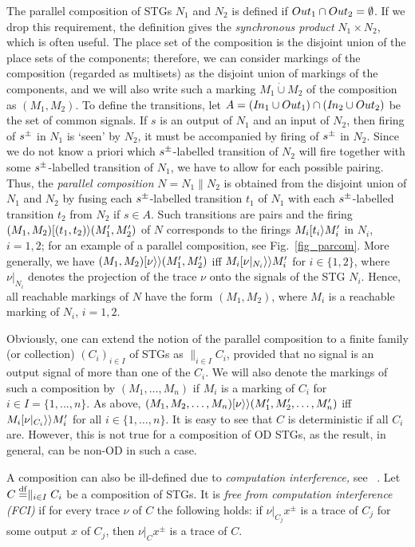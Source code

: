 The parallel composition of STGs $N_1$ and $N_2$ is defined if
$\Ot_1 \cap \Ot_2 = \emptyset$. If we drop this requirement, the
definition gives the {\em synchronous product} $N_1\times N_2$,
which is often useful. The place set of the composition is
the disjoint union of the place sets of the components; therefore,
we can consider markings of the composition (regarded as multisets)
as the disjoint union of markings of the components,
and we will also write such a marking $M_1 \dot{\cup} M_2$
of the composition as $(M_1, M_2)$. To define the transitions,  let
$A=(\I_1 \cup \Ot_1) \cap (\I_2 \cup \Ot_2)$ be the set of
common signals.
If \eg $s$ is an output of $N_1$ and an input of $N_2$,
then firing of $s^\pm$ in $N_1$ is `seen' by
$N_2$, \ie it must be accompanied by firing of $s^\pm$
in $N_2$. Since we do not know a priori which $s^\pm$-labelled
transition of $N_2$ will fire together with some $s^\pm$-labelled
transition of $N_1$, we have to allow for each possible
pairing.
Thus, the {\em parallel composition} $N = N_1 \parallel N_2$
is obtained from the disjoint union of $N_1$ and $N_2$ by
fusing
each $s^\pm$-labelled transition $t_1$ of $N_1$
with each $s^\pm$-labelled transition $t_2$ from $N_2$ if $s \in A$.
Such transitions are pairs and the firing $(M_1, M_2)[(t_1,t_2) \rangle(M_1', M_2')$ of $N$
corresponds to the firings $M_i[t_i\rangle M_i'$ in $N_i$, $i=1,2$; for an example
of a parallel composition, see Fig.~\ref{fig_parcom}.
More generally, we have $(M_1, M_2) [\nu\rangle\rangle (M_1', M_2')$ iff
$M_i [\nu|_{N_i}\rangle\rangle M_i'$ for  $i\in\{1,2\}$, where
$\nu|_{N_i}$ denotes the projection of the trace $\nu$ onto the signals of the STG ${N_i}$.
Hence, all reachable markings of $N$ have the form $(M_1, M_2)$,
where $M_i$ is a reachable marking of $N_i$, $i=1,2$.

Obviously, one can extend the notion of the parallel
composition to a finite family (or collection) $(C_i)_{i\in I}$ of
STGs as $\parallel_{i\in I} C_i$,
provided that no signal is an output signal of more than one of the
$C_i$. We will also denote the markings of such a composition
by $(M_1, \ldots,M_n)$ if $M_i$ is a marking of $C_i$ for
$i\in I=\{1,...,n\}$.
As above, $(M_1, M_2, \ldots, M_n) [\nu\rangle\rangle (M_1', M_2', \ldots, M_n')$ iff
$M_i [\nu|_{C_i}\rangle\rangle M_i'$ for all $i\in\{1,\ldots,n\}$.
It is easy to see that $C$ is deterministic if all $C_i$ are. However, this is not true for a composition of OD STGs, as the result, in general, can be non-OD in such a case.

A composition can also be ill-defined due to \emph{computation interference,} see \eg~\cite{eber92}.
Let $C\stackrel{\mathrm{df}}{=}\parallel_{i\in I}C_{i}$ be a composition of STGs. It is
\emph{free from computation interference (FCI)} if for every trace $\nu$ of $C$
the following holds: if $\nu|_{C_{j}}x^{\pm}$ is a trace of $C_{j}$
for some output $x$ of $C_{j}$, then $\nu|_{C}x^{\pm}$ is a trace
of $C$.

